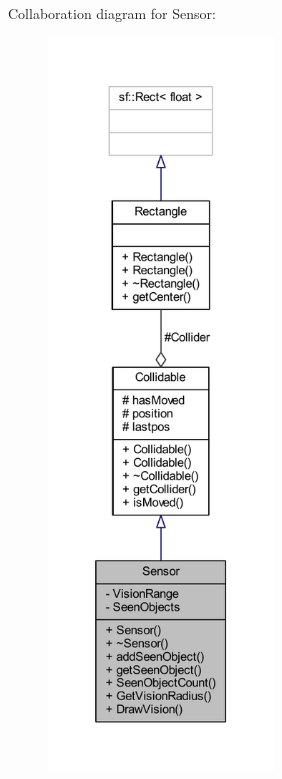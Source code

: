Collaboration diagram for Sensor\-:
\nopagebreak
\begin{figure}[H]
\begin{center}
\leavevmode
\includegraphics[height=550pt]{class_sensor__coll__graph}
\end{center}
\end{figure}
